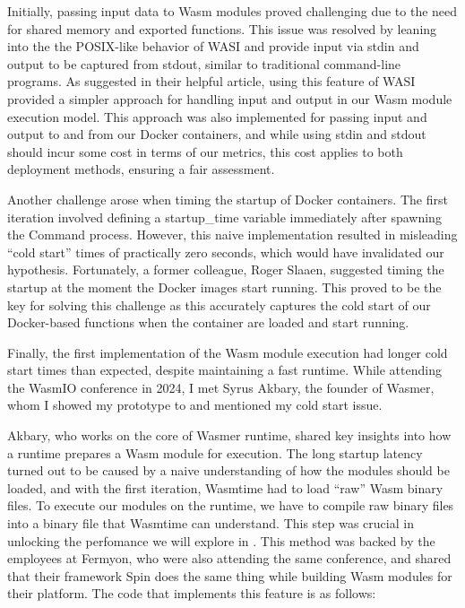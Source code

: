\documentclass[
  table]{report}
\begin{document}
Initially, passing input data to Wasm modules proved challenging due to
the need for shared memory and exported functions. This issue was
resolved by leaning into the the POSIX-like behavior of WASI and provide
input via stdin and output to be captured from stdout, similar to
traditional command-line programs. As
\citet{malmgrenGettingDataOut2022a} suggested in their helpful article,
using this feature of WASI provided a simpler approach for handling
input and output in our Wasm module execution model. This approach was
also implemented for passing input and output to and from our Docker
containers, and while using stdin and stdout should incur some cost in
terms of our metrics, this cost applies to both deployment methods,
ensuring a fair assessment.

Another challenge arose when timing the startup of Docker containers.
The first iteration involved defining a startup\_time variable
immediately after spawning the Command process. However, this naive
implementation resulted in misleading ``cold start'' times of
practically zero seconds, which would have invalidated our hypothesis.
Fortunately, a former colleague, Roger Slaaen, suggested timing the
startup at the moment the Docker images start running. This proved to be
the key for solving this challenge as this accurately captures the cold
start of our Docker-based functions when the container are loaded and
start running.

Finally, the first implementation of the \ac{Wasm} module execution had
longer cold start times than expected, despite maintaining a fast
runtime. While attending the WasmIO conference in 2024, I met Syrus
Akbary, the founder of Wasmer, whom I showed my prototype to and
mentioned my cold start issue.

Akbary, who works on the core of Wasmer runtime, shared key insights
into how a runtime prepares a \ac{Wasm} module for execution. The long
startup latency turned out to be caused by a naive understanding of how
the modules should be loaded, and with the first iteration, Wasmtime had
to load ``raw'' Wasm binary files. To execute our modules on the
runtime, we have to compile raw binary files into a binary file that
Wasmtime can understand. This step was crucial in unlocking the
perfomance we will explore in . This method was
backed by the employees at Fermyon, who were also attending the same
conference, and shared that their framework Spin does the same thing
while building \ac{Wasm} modules for their platform. The code that
implements this feature is as follows:
\end{document}
